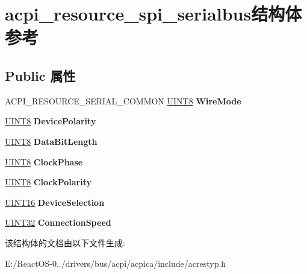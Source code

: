 \hypertarget{structacpi__resource__spi__serialbus}{}\section{acpi\+\_\+resource\+\_\+spi\+\_\+serialbus结构体 参考}
\label{structacpi__resource__spi__serialbus}
\subsection*{Public 属性}
\begin{DoxyCompactItemize}
\item 
\mbox{\label{structacpi__resource__spi__serialbus_aaf7a14156eff277843d1c253d797cee5}} 
A\+C\+P\+I\+\_\+\+R\+E\+S\+O\+U\+R\+C\+E\+\_\+\+S\+E\+R\+I\+A\+L\+\_\+\+C\+O\+M\+M\+ON \hyperlink{_processor_bind_8h_ab27e9918b538ce9d8ca692479b375b6a}{U\+I\+N\+T8} {\bfseries Wire\+Mode}
\item 
\mbox{\label{structacpi__resource__spi__serialbus_ad068c916d6d57090ed1fc3cd9c039dc6}} 
\hyperlink{_processor_bind_8h_ab27e9918b538ce9d8ca692479b375b6a}{U\+I\+N\+T8} {\bfseries Device\+Polarity}
\item 
\mbox{\label{structacpi__resource__spi__serialbus_aae04593962a4b410274ffd2a0513542a}} 
\hyperlink{_processor_bind_8h_ab27e9918b538ce9d8ca692479b375b6a}{U\+I\+N\+T8} {\bfseries Data\+Bit\+Length}
\item 
\mbox{\label{structacpi__resource__spi__serialbus_aaf912e1ed13b8bcd5621696b42ef4cdd}} 
\hyperlink{_processor_bind_8h_ab27e9918b538ce9d8ca692479b375b6a}{U\+I\+N\+T8} {\bfseries Clock\+Phase}
\item 
\mbox{\label{structacpi__resource__spi__serialbus_a75a64d181c73e230e01c6c05cb4945b4}} 
\hyperlink{_processor_bind_8h_ab27e9918b538ce9d8ca692479b375b6a}{U\+I\+N\+T8} {\bfseries Clock\+Polarity}
\item 
\mbox{\label{structacpi__resource__spi__serialbus_a0121a16fe12f0a6f38c796929f3b3439}} 
\hyperlink{_processor_bind_8h_a09f1a1fb2293e33483cc8d44aefb1eb1}{U\+I\+N\+T16} {\bfseries Device\+Selection}
\item 
\mbox{\label{structacpi__resource__spi__serialbus_a78acd8a54a292917443a06a294a6cefb}} 
\hyperlink{_processor_bind_8h_ae1e6edbbc26d6fbc71a90190d0266018}{U\+I\+N\+T32} {\bfseries Connection\+Speed}
\end{DoxyCompactItemize}


该结构体的文档由以下文件生成\+:\begin{DoxyCompactItemize}
\item 
E\+:/\+React\+O\+S-\/0../drivers/bus/acpi/acpica/include/acrestyp.\+h\end{DoxyCompactItemize}
